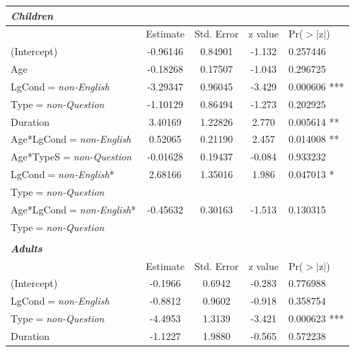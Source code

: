 \documentclass[authoryear, 12pt]{elsarticle}
\begin{document}
\begin{table}[h!]
  \begin{scriptsize}
\begin{center}
  \begin{tabular}{lcccl}
  \textbf{\textit{Children}} &&&& \\
    \hline
                   & Estimate & Std. Error & z value & Pr($>$$|$z$|$)    \\
    \hline
    (Intercept)   &      -0.96146 &   0.84901 & -1.132 & 0.257446 \\    
    Age             &    -0.18268 &   0.17507 & -1.043 & 0.296725   \\  
    LgCond$=$\textit{non-English} &          -3.29347 &   0.96045 & -3.429 & 0.000606 *** \\
    Type$=$\textit{non-Question}          &     -1.10129 &   0.86494 & -1.273 & 0.202925     \\
    Duration      &       3.40169 &   1.22826 &  2.770 & 0.005614  **\\
    Age*LgCond$=$\textit{non-English} &       0.52065 &   0.21190 &  2.457 & 0.014008 ** \\  
    Age*TypeS$=$\textit{non-Question}          & -0.01628 &   0.19437 & -0.084 & 0.933232     \\
    LgCond$=$\textit{non-English}* &     2.68166 &   1.35016 &  1.986 & 0.047013 * \\
    \hspace*{5mm} Type$=$\textit{non-Question} &&&& \\
    Age*LgCond$=$\textit{non-English}* & -0.45632 &   0.30163 & -1.513 & 0.130315  \\
    \hspace*{5mm} Type$=$\textit{non-Question} &&&& \\
    \hline
  &&&& \\
  \textbf{\textit{Adults}} &&&& \\
    \hline
                       &  Estimate & Std. Error & z value & Pr($>$$|$z$|$) \\    
    \hline
    (Intercept)       &        -0.1966 &    0.6942 & -0.283 & 0.776988     \\
    LgCond$=$\textit{non-English}    &             -0.8812 &    0.9602 & -0.918 & 0.358754   \\  
    Type$=$\textit{non-Question}             &        -4.4953 &    1.3139 & -3.421 & 0.000623 *** \\
    Duration          &        -1.1227 &    1.9880 & -0.565 & 0.572238     \\

\end{tabular}
\end{center}
\end{scriptsize}
\end{table}
\end{document}
